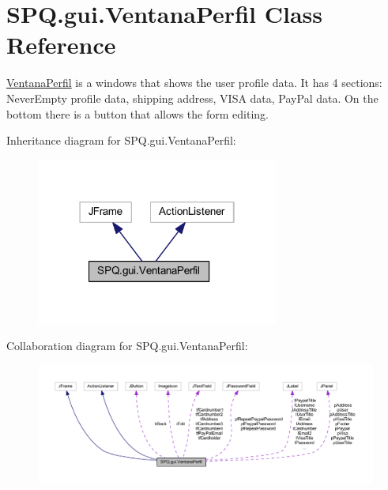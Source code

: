 \hypertarget{class_s_p_q_1_1gui_1_1_ventana_perfil}{}\section{S\+P\+Q.\+gui.\+Ventana\+Perfil Class Reference}
\label{class_s_p_q_1_1gui_1_1_ventana_perfil}


\mbox{\hyperlink{class_s_p_q_1_1gui_1_1_ventana_perfil}{Ventana\+Perfil}} is a windows that shows the user profile data. It has 4 sections\+: Never\+Empty profile data, shipping address, V\+I\+SA data, Pay\+Pal data. On the bottom there is a button that allows the form editing.  




Inheritance diagram for S\+P\+Q.\+gui.\+Ventana\+Perfil\+:\nopagebreak
\begin{figure}[H]
\begin{center}
\leavevmode
\includegraphics[width=226pt]{class_s_p_q_1_1gui_1_1_ventana_perfil__inherit__graph}
\end{center}
\end{figure}


Collaboration diagram for S\+P\+Q.\+gui.\+Ventana\+Perfil\+:\nopagebreak
\begin{figure}[H]
\begin{center}
\leavevmode
\includegraphics[width=350pt]{class_s_p_q_1_1gui_1_1_ventana_perfil__coll__graph}
\end{center}
\end{figure}

